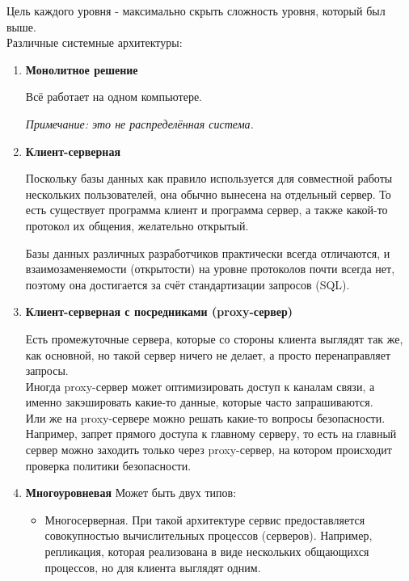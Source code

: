 \noindent Цель каждого уровня - максимально скрыть сложность уровня, который был выше.\\
{\large Различные системные архитектуры:}
\begin{enumerate}
\item \textbf{ Монолитное решение}

Всё работает на одном компьютере.

\textit{ Примечание: это не распределённая система.}

\item \textbf{ Клиент-серверная}

Поскольку базы данных как правило используется для совместной работы нескольких пользователей, она обычно вынесена на отдельный сервер. 
То есть существует программа клиент и программа сервер, а также какой-то протокол их общения, желательно открытый.

Базы данных различных разработчиков практически всегда отличаются, и взаимозаменяемости (открытости) на уровне протоколов почти всегда нет, поэтому она достигается за счёт стандартизации запросов (SQL).

\item \textbf{ Клиент-серверная с посредниками (proxy-сервер)}

Есть промежуточные сервера, которые со стороны клиента выглядят так же, как основной, но такой сервер ничего не делает, а просто перенаправляет запросы.\\
Иногда proxy-сервер может оптимизировать доступ к каналам связи, а именно закэшировать какие-то данные, которые часто запрашиваются.\\
Или же на proxy-сервере можно решать какие-то вопросы безопасности. Например, запрет прямого доступа к главному серверу, то есть на главный сервер можно заходить только через proxy-сервер, на котором происходит проверка политики безопасности.

\item \textbf{ Многоуровневая}
Может быть двух типов:
\begin{itemize}
\item
Многосерверная. При такой архитектуре сервис предоставляется совокупностью вычислительных процессов (серверов). Например, репликация, которая реализована в виде нескольких общающихся процессов, но для клиента выглядят одним.\\


\end{itemize}
\end{enumerate}
